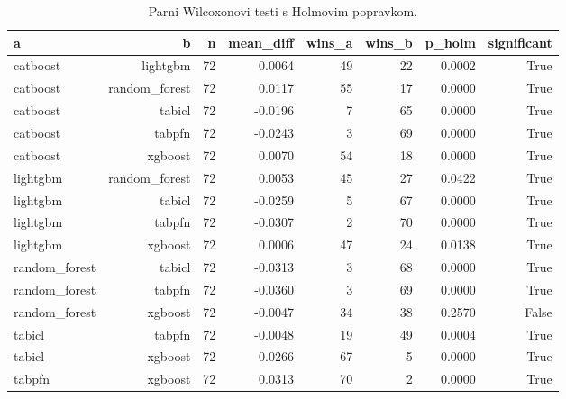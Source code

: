 \begin{table}[htbp]
\centering
\caption{Parni Wilcoxonovi testi s Holmovim popravkom.}
\label{tab:wilcoxon}
\begin{tabular}{lrrrrrrr}
\hline
a & b & n & mean\_diff & wins\_a & wins\_b & p\_holm & significant \\
\hline
catboost & lightgbm & 72 & 0.0064 & 49 & 22 & 0.0002 & True \\
catboost & random\_forest & 72 & 0.0117 & 55 & 17 & 0.0000 & True \\
catboost & tabicl & 72 & -0.0196 & 7 & 65 & 0.0000 & True \\
catboost & tabpfn & 72 & -0.0243 & 3 & 69 & 0.0000 & True \\
catboost & xgboost & 72 & 0.0070 & 54 & 18 & 0.0000 & True \\
lightgbm & random\_forest & 72 & 0.0053 & 45 & 27 & 0.0422 & True \\
lightgbm & tabicl & 72 & -0.0259 & 5 & 67 & 0.0000 & True \\
lightgbm & tabpfn & 72 & -0.0307 & 2 & 70 & 0.0000 & True \\
lightgbm & xgboost & 72 & 0.0006 & 47 & 24 & 0.0138 & True \\
random\_forest & tabicl & 72 & -0.0313 & 3 & 68 & 0.0000 & True \\
random\_forest & tabpfn & 72 & -0.0360 & 3 & 69 & 0.0000 & True \\
random\_forest & xgboost & 72 & -0.0047 & 34 & 38 & 0.2570 & False \\
tabicl & tabpfn & 72 & -0.0048 & 19 & 49 & 0.0004 & True \\
tabicl & xgboost & 72 & 0.0266 & 67 & 5 & 0.0000 & True \\
tabpfn & xgboost & 72 & 0.0313 & 70 & 2 & 0.0000 & True \\
\hline
\end{tabular}
\end{table}
